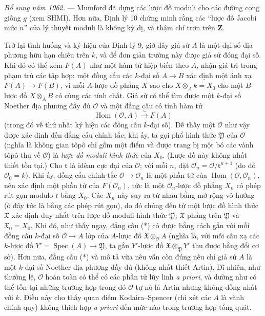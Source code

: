 \emph{Bổ sung năm 1962.} --- Mumford đã dựng các lược đồ moduli cho các đường
cong giống $g$ (xem SHMI). Hơn nữa, Định lý 10 chứng minh rằng các “lược đồ
Jacobi mức $n$” của lý thuyết moduli là không kỳ dị, và thậm chí trơn trên
$\mathbf Z$.

Trở lại tình huống và ký hiệu của Định lý 9, giờ đây giả sử $A$ là một đại số
địa phương hữu hạn chiều trên $k$, và để đơn giản trường này được giả sử đóng đại số.
Khi đó có thể xem $F(A)$ như một hàm tử hiệp biến theo $A$, nhận giá trị trong
phạm trù các tập hợp: một đồng cấu các $k$-đại số $A\longrightarrow B$ xác
định một ánh xạ $F(A)\longrightarrow F(B)$, vì mỗi $A$-lược đồ phẳng $X$ sao
cho $X\otimes_A k=X_0$ cho một $B$-lược đồ $X\otimes_A B$ có cùng các tính
chất. Giả sử có thể tìm được một $k$-đại số Noether địa phương đầy đủ
$\mathcal O$ và một đẳng cấu có tính hàm tử
\begin{equation}
  \tag{*}
  \operatorname{Hom}(\mathcal O,A)\xrightarrow{\sim}F(A)
\end{equation}
(trong đó vế thứ nhất ký hiệu các đồng cấu $k$-đại số). Dễ thấy một
$\mathcal O$ như vậy được xác định đến đẳng cấu chính tắc; khi ấy, ta gọi phổ
hình thức $\mathfrak Y$ của $\mathcal O$ (nghĩa là không gian tôpô chỉ gồm
một điểm và được trang bị một bó các vành tôpô thu về $\mathcal O$) là
\emph{lược đồ moduli hình thức} của $X_0$. (Lược đồ này không nhất thiết tồn
tại.) Cho $\mathfrak r$ là iđêan cực đại của $\mathcal O$; với mỗi $n$, đặt
$\mathcal O_n=\mathcal O/\mathfrak r^{n+1}$ (do đó $\mathcal O_0=k$). Khi
ấy, đồng cấu chính tắc $\mathcal O\longrightarrow\mathcal O_n$ là một phần tử
của $\operatorname{Hom}(\mathcal O,\mathcal O_n)$, nên xác định một phần tử
của $F(\mathcal O_n)$, tức là một $\mathcal O_n$-lược đồ phẳng $X_n$ có phép
rút gọn modulo $\mathfrak r$ bằng $X_0$. Các $X_n$ này suy ra từ nhau bằng
mở rộng vô hướng (ở đây tức là bằng các phép rút gọn), do đó chúng đến từ một
lược đồ hình thức $\mathfrak X$ xác định duy nhất trên lược đồ moduli hình
thức $\mathfrak Y$; $\mathfrak X$ phẳng trên $\mathfrak Y$ và
$\mathfrak X_0=X_0$. Khi đó, như thấy ngay, đẳng cấu (*) có được bằng cách
gắn với mỗi đồng cấu $k$-đại số $\mathcal O\longrightarrow A$ lớp của
$A$-lược đồ $\mathfrak X\otimes_{\mathcal O}A$ (nghĩa là, với mỗi cấu xạ các
$k$-lược đồ $Y'=\operatorname{Spec}(A)\longrightarrow\mathfrak Y$, ta gắn
$Y'$-lược đồ $\mathfrak X\otimes_{\mathfrak Y}Y'$ thu được bằng đổi cơ sở).
Hơn nữa, đẳng cấu (*) và mô tả vừa nêu vẫn còn đúng nếu chỉ giả sử $A$ là một
$k$-đại số Noether địa phương đầy đủ (không nhất thiết Artin). Dĩ nhiên, như
thường lệ, $\mathcal O$ hoàn toàn có thể có các phần tử lũy linh
\textit{a priori}, và dường như có thể tồn tại những trường hợp trong đó
$\mathcal O$ tự nó là Artin nhưng không đồng nhất với $k$. Điều này cho thấy
quan điểm Kodaira--Spencer (chỉ xét các $A$ là vành chính quy) không thích hợp
\textit{a priori} đến mức nào trong trường hợp tổng quát.

